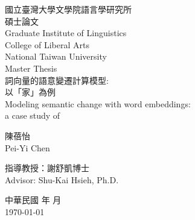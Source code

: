 \begin{titlepage}
    \begin{center}
        \titlepagestyle
        國立臺灣大學文學院語言學研究所\\
        碩士論文\\
        \vspace{.3cm}
        \fontsize{14}{14}\selectfont
        \linespread{1.5}
        Graduate Institute of Linguistics\\
        College of Liberal Arts\\
        \vspace{.3cm}
        \fontsize{16}{16}\selectfont
        \linespread{1.5}
        National Taiwan University\\
        Master Thesis\\

        \vspace{1.5cm}
        \titlepagestyle
        詞向量的語意變遷計算模型:\\
        以「家」為例\\
        Modeling semantic change with word embeddings:\\
        a case study of \jia

        \vspace{2.5cm}
        陳蓓怡\\
        Pei-Yi Chen

        \vspace{1cm}
        指導教授：謝舒凱\:博士\\
        Advisor: Shu-Kai Hsieh, Ph.D.
            
        \vspace{1cm}
        中華民國 \yearZH 年 \the\month 月\\
        \monthyearEN\today
    \end{center}
    \restoregeometry
\end{titlepage}